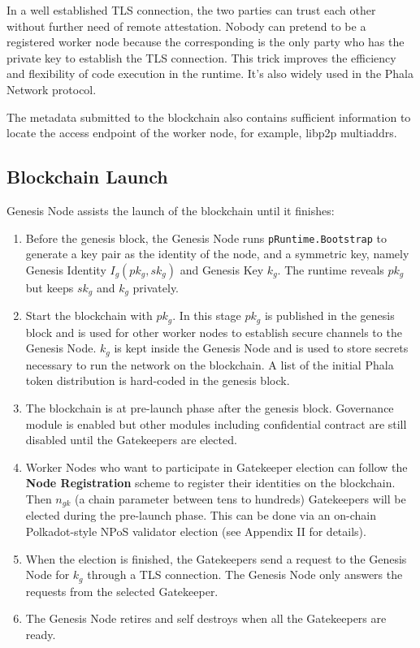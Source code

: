 In a well established TLS connection, the two parties can trust each other without further need of remote attestation. Nobody can pretend to be a registered worker node because the corresponding \pruntime is the only party who has the private key to establish the TLS connection. This trick improves the efficiency and flexibility of code execution in the runtime. It's also widely used in the Phala Network protocol.

The metadata submitted to the blockchain also contains sufficient information to locate the access endpoint of the worker node, for example, libp2p multiaddrs.

\subsection{Blockchain Launch}

Genesis Node assists the launch of the blockchain until it finishes:

\begin{enumerate}
    \item Before the genesis block, the Genesis Node runs \texttt{pRuntime.Bootstrap} to generate a key pair as the identity of the node, and a symmetric key, namely Genesis Identity $I_g(pk_g, sk_g)$ and Genesis Key $k_g$. The runtime reveals $pk_g$ but keeps $sk_g$ and $k_g$ privately.

    \item Start the blockchain with $pk_g$. In this stage $pk_g$ is published in the genesis block and is used for other worker nodes to establish secure channels to the Genesis Node. $k_g$ is kept inside the Genesis Node and is used to store secrets necessary to run the network on the blockchain. A list of the initial Phala token distribution is hard-coded in the genesis block.

    \item The blockchain is at pre-launch phase after the genesis block. Governance module is enabled but other modules including confidential contract are still disabled until the Gatekeepers are elected.

    \item Worker Nodes who want to participate in Gatekeeper election can follow the \textbf{Node Registration} scheme to register their identities on the blockchain. Then $n_{gk}$ (a chain parameter between tens to hundreds) Gatekeepers will be elected during the pre-launch phase. This can be done via an on-chain Polkadot-style NPoS validator election (see Appendix II for details).

    \item When the election is finished, the Gatekeepers send a request to the Genesis Node for $k_g$ through a TLS connection. The Genesis Node only answers the requests from the selected Gatekeeper.

    \item The Genesis Node retires and self destroys when all the Gatekeepers are ready.
\end{enumerate}

